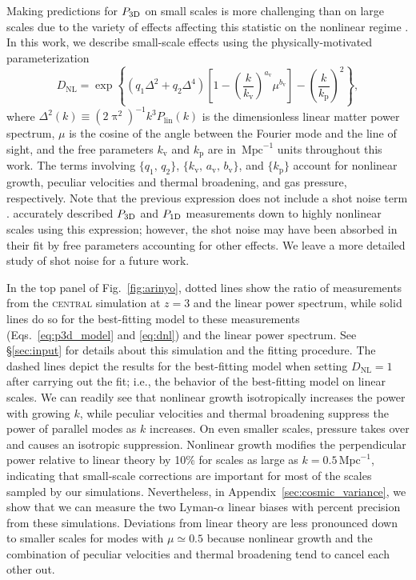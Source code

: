 \documentclass[longauth]{aa}
\newcommand{\lya}{Lyman-$\alpha$\xspace}
\newcommand{\poned}{\ensuremath{P_{\rm 1D}}\xspace}
\newcommand{\pthreed}{\ensuremath{P_{\rm 3D}}\xspace}
\newcommand{\simcentral}{\textsc{central}\xspace}
\newcommand{\iMpc}{\ensuremath{\,\mathrm{Mpc}^{-1}}}
\begin{document}
Making predictions for \pthreed on small scales is more challenging than on large scales due to the variety of effects affecting this statistic on the nonlinear regime \citep[e.g.;][]{mcdonald2003MeasurementCosmologicalGeometry}. In this work, we describe small-scale effects using the physically-motivated \citet{arinyo-i-prats2015NonlinearPowerSpectrum} parameterization
%
\begin{equation}
    \label{eq:dnl}
    D_\mathrm{NL} = \exp \left\{\left(q_1 \Delta^2 + q_2 \Delta^4\right) \left[1-\left(\frac{k}{k_\mathrm{v}}\right)^{a_\mathrm{v}} \mu^{b_\mathrm{v}}\right] - \left(\frac{k}{k_\mathrm{p}}\right)^2 \right\},
\end{equation}
%
where $\Delta^2(k)\equiv(2\uppi^2)^{-1} k^3 P_\mathrm{lin}(k)$ is the dimensionless linear matter power spectrum, $\mu$ is the cosine of the angle between the Fourier mode and the line of sight, and the free parameters $k_\mathrm{v}$ and $k_\mathrm{p}$ are in $\iMpc$ units throughout this work. The terms involving $\{q_1,\,q_2\}$, $\{k_\mathrm{v},\, a_\mathrm{v},\, b_\mathrm{v}\}$, and $\{k_\mathrm{p}\}$ account for nonlinear growth, peculiar velocities and thermal broadening, and gas pressure, respectively. Note that the previous expression does not include a shot noise term \citep[e.g.;][]{irsicmcquinn2018}. \citet{givans2022NonlinearitiesLymanAlpha} accurately described \pthreed and \poned measurements down to highly nonlinear scales using this expression; however, the shot noise may have been absorbed in their fit by free parameters accounting for other effects. We leave a more detailed study of shot noise for a future work.

In the top panel of Fig.~\ref{fig:arinyo}, dotted lines show the ratio of measurements from the \simcentral simulation at $z=3$ and the linear power spectrum, while solid lines do so for the best-fitting model to these measurements (Eqs.~\ref{eq:p3d_model} and \ref{eq:dnl}) and the linear power spectrum. See \S\ref{sec:input} for details about this simulation and the fitting procedure. The dashed lines depict the results for the best-fitting model when setting $D_\mathrm{NL}=1$ after carrying out the fit; i.e., the behavior of the best-fitting model on linear scales. We can readily see that nonlinear growth isotropically increases the power with growing $k$, while peculiar velocities and thermal broadening suppress the power of parallel modes as $k$ increases. On even smaller scales, pressure takes over and causes an isotropic suppression. Nonlinear growth modifies the perpendicular power relative to linear theory by 10\% for scales as large as $k=0.5\iMpc$, indicating that small-scale corrections are important for most of the scales sampled by our simulations. Nevertheless, in Appendix~\ref{sec:cosmic_variance}, we show that we can measure the two \lya linear biases with percent precision from these simulations. Deviations from linear theory are less pronounced down to smaller scales for modes with $\mu\simeq0.5$ because nonlinear growth and the combination of peculiar velocities and thermal broadening tend to cancel each other out.
\end{document}
